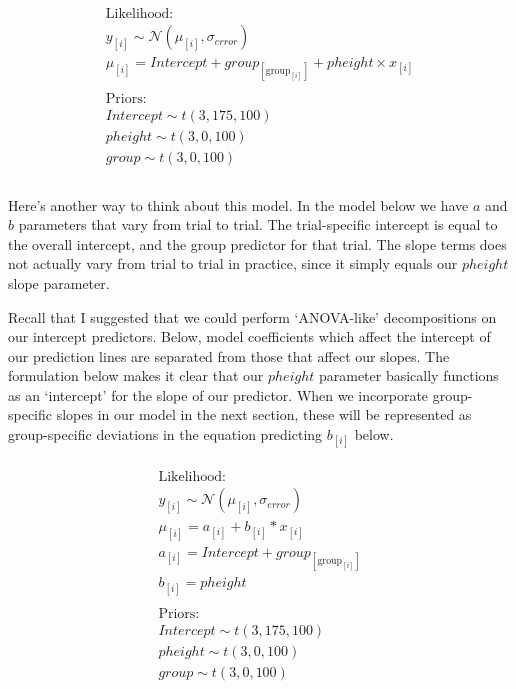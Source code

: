 \documentclass[
]{book}
\begin{document}
\begin{equation}
\begin{split}
\\
\textrm{Likelihood:} \\
y_{[i]} \sim \mathcal{N}(\mu_{[i]},\sigma_{error}) \\
\mu_{[i]} = Intercept + group_{[\mathrm{group}_{[i]}]} + pheight \times x_{[i]}  \\ \\
\textrm{Priors:} \\
Intercept \sim t(3, 175, 100) \\
pheight \sim t(3, 0, 100) \\ 
group \sim t(3, 0, 100) \\ 
\\
\end{split}
\label{eq:510}
\end{equation}

Here's another way to think about this model. In the model below we have \(a\) and \(b\) parameters that vary from trial to trial. The trial-specific intercept is equal to the overall intercept, and the group predictor for that trial. The slope terms does not actually vary from trial to trial in practice, since it simply equals our \(pheight\) slope parameter.

Recall that I suggested that we could perform `ANOVA-like' decompositions on our intercept predictors. Below, model coefficients which affect the intercept of our prediction lines are separated from those that affect our slopes. The formulation below makes it clear that our \(pheight\) parameter basically functions as an `intercept' for the slope of our predictor. When we incorporate group-specific slopes in our model in the next section, these will be represented as group-specific deviations in the equation predicting \(b_{[i]}\) below.

\begin{equation}
\begin{split}
\\
\textrm{Likelihood:} \\
y_{[i]} \sim \mathcal{N}(\mu_{[i]},\sigma_{error}) \\
\mu_{[i]} = a_{[i]} + b_{[i]} * x_{[i]}  \\ 
a_{[i]} = Intercept + group_{[\mathrm{group}_{[i]}]} \\
b_{[i]} = pheight \\ \\
\textrm{Priors:} \\
Intercept \sim t(3, 175, 100) \\
pheight \sim t(3, 0, 100) \\ 
group \sim t(3, 0, 100) \\ 
\\
\end{split}
\label{eq:511}
\end{equation}
\end{document}

